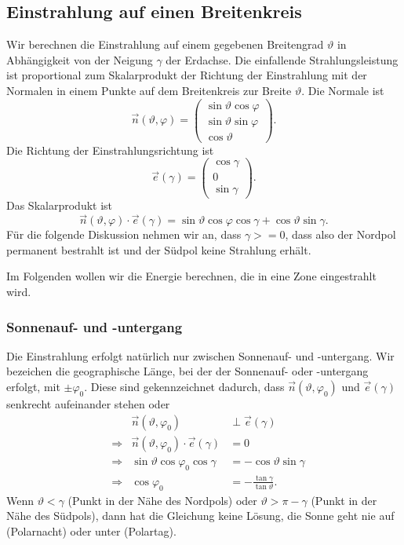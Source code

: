 %
%
%
\subsection{Einstrahlung auf einen Breitenkreis}
Wir berechnen die Einstrahlung auf einem gegebenen Breitengrad
$\vartheta$ in Abhängigkeit von der Neigung $\gamma$
der Erdachse.
Die einfallende Strahlungsleistung ist proportional zum Skalarprodukt
der Richtung der Einstrahlung mit der Normalen in einem Punkte
auf dem Breitenkreis zur Breite $\vartheta$.
Die Normale ist
\[
\vec n(\vartheta,\varphi)
=
\begin{pmatrix}
\sin\vartheta\cos\varphi\\
\sin\vartheta\sin\varphi\\
\cos\vartheta
\end{pmatrix}.
\]
Die Richtung der Einstrahlungsrichtung ist
\[
\vec e(\gamma)
=
\begin{pmatrix}
\cos\gamma\\
0\\
\sin\gamma
\end{pmatrix}.
\]
Das Skalarprodukt ist
\begin{equation}
\vec n(\vartheta,\varphi)\cdot\vec e(\gamma)
=
\sin\vartheta\cos\varphi\cos\gamma
+
\cos\vartheta\sin\gamma.
\label{skript:einstrahlung:skalarprodukt}
\end{equation}
Für die folgende Diskussion nehmen wir an, dass $\gamma >= 0$,
dass also der Nordpol permanent bestrahlt ist und der Südpol keine
Strahlung erhält.

Im Folgenden wollen wir die Energie berechnen, die in eine Zone
eingestrahlt wird.

\subsubsection{Sonnenauf- und -untergang}
Die Einstrahlung erfolgt natürlich nur zwischen Sonnenauf- und
-untergang.
Wir bezeichen die geographische Länge, bei der der Sonnenauf- oder
-untergang erfolgt, mit $\pm\varphi_0$.
Diese sind gekennzeichnet dadurch, dass $\vec n(\vartheta,\varphi_0)$ und
$\vec e(\gamma)$ senkrecht aufeinander stehen oder
\begin{equation*}
\begin{aligned}
&&
\vec n(\vartheta,\varphi_0)&\perp \vec e(\gamma)
\\
&\Rightarrow&
\vec n(\vartheta,\varphi_0)\cdot \vec e(\gamma)&=0
\\
&\Rightarrow&
\sin\vartheta\cos\varphi_0\cos\gamma
&=
-
\cos\vartheta\sin\gamma
\\
&\Rightarrow&
\cos\varphi_0
&=
-\frac{\tan\gamma}{\tan\vartheta}.
\end{aligned}
\end{equation*}
Wenn $\vartheta < \gamma$ (Punkt in der Nähe des Nordpols) oder
$\vartheta > \pi - \gamma$ (Punkt in der Nähe des Südpols),
dann hat die Gleichung keine Lösung,
die Sonne geht nie auf (Polarnacht) oder unter (Polartag).

